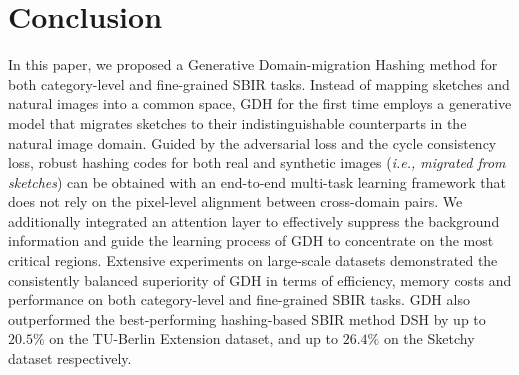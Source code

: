 \documentclass[runningheads]{llncs}
\begin{document}
\section{Conclusion}
In this paper, we proposed a Generative Domain-migration Hashing method for both category-level and fine-grained SBIR tasks. Instead of mapping sketches and natural images into a common space, GDH for the first time employs a generative model that migrates sketches to their indistinguishable counterparts in the natural image domain. Guided by the adversarial loss and the cycle consistency loss, robust hashing codes for both real and synthetic images (\emph{i.e., migrated from sketches}) can be obtained with an end-to-end multi-task learning framework that does not rely on the pixel-level alignment between cross-domain pairs. We additionally integrated an attention layer to effectively suppress the background information and guide the learning process of GDH to concentrate on the most critical regions. Extensive experiments  on large-scale datasets demonstrated the consistently balanced superiority of GDH in terms of efficiency, memory costs and performance on both category-level and fine-grained SBIR tasks. GDH also outperformed the best-performing hashing-based SBIR method DSH \cite{LiuSSLS17} by up to $20.5\%$ on the TU-Berlin Extension dataset, and up to $26.4\%$ on the Sketchy dataset respectively. 





\end{document}
